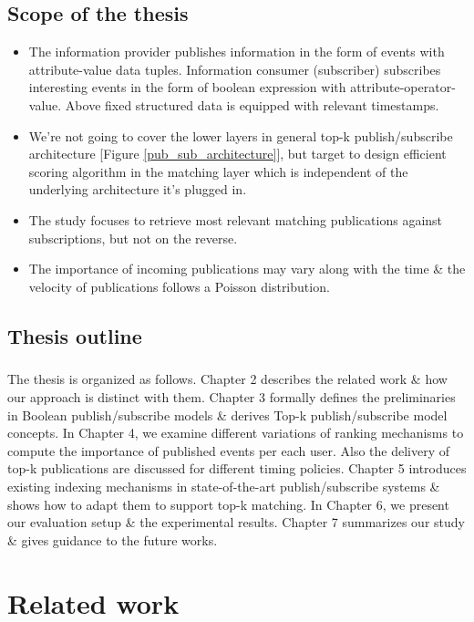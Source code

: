 \documentclass[a4paper,12pt,oneside]{book}
\theoremstyle{definition}
\theoremstyle{remark}
\begin{document}
\section{Scope of the thesis}
\begin{itemize}
\item The information provider publishes information in the form of events with attribute-value data tuples. Information consumer (subscriber) subscribes interesting events in the form of boolean expression with attribute-operator-value. Above fixed structured data is equipped with relevant timestamps.
\item We're not going to cover the lower layers in general top-k publish/subscribe architecture [Figure \ref{pub_sub_architecture}], but target to design efficient scoring algorithm in the matching layer which is independent of the underlying architecture it's plugged in.
\item The study focuses to retrieve most relevant matching publications against subscriptions, but not on the reverse.
\item The importance of incoming publications may vary along with the time \& the velocity of publications follows a Poisson distribution.
\end{itemize}
 
\section{Thesis outline}
\paragraph*{}
The thesis is organized as follows. Chapter 2 describes the related work \& how our approach is distinct with them. Chapter 3 formally defines the preliminaries in Boolean publish/subscribe models \& derives Top-k publish/subscribe model concepts. In Chapter 4, we examine different variations of ranking mechanisms to compute the importance of published events per each user. Also the delivery of top-k publications are discussed for different timing policies. Chapter 5 introduces existing indexing mechanisms in state-of-the-art publish/subscribe systems \& shows how to adapt them to support top-k matching. In Chapter 6, we present our evaluation setup \& the experimental results. Chapter 7 summarizes our study \& gives guidance to the future works. 

\chapter{Related work}
\end{document}
